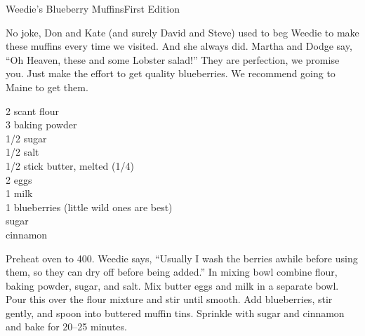 \begin{entry}{Weedie's Blueberry Muffins}{First Edition}

\begin{open}
  No joke, Don and Kate (and surely David and Steve) used to beg Weedie to make these muffins every time we visited. And she always did. Martha and Dodge say, ``Oh Heaven, these and some Lobster salad!'' They are perfection,
  we promise you. Just make the effort to get quality blueberries. We
  recommend going to Maine to get them.
\end{open}
\begin{ingredients}
  2 scant \si{\cup} flour\\
  \SI{3}{\teaspoon} baking powder\\
  \SI{1/2}{\cup} sugar\\
  \SI{1/2}{\teaspoon} salt\\
  \num{1/2} stick butter, melted (\SI{1/4}{\cup})\\
  2 eggs\\
  \SI{1}{\cup} milk\\
  \SI{1}{\cup} blueberries (little wild ones are best)\\
  sugar\\
  cinnamon
\end{ingredients}
Preheat oven to \SI{400}{\degreeF}. Weedie says, ``Usually I wash the berries
awhile before using them, so they can dry off before being added.'' In mixing
bowl combine flour, baking powder, sugar, and salt. Mix butter eggs and milk
in a separate bowl. Pour this over the flour mixture and stir until
smooth. Add blueberries, stir gently, and spoon into buttered muffin
tins. Sprinkle with sugar and cinnamon and bake for \numrange{20}{25} minutes.
\end{entry}